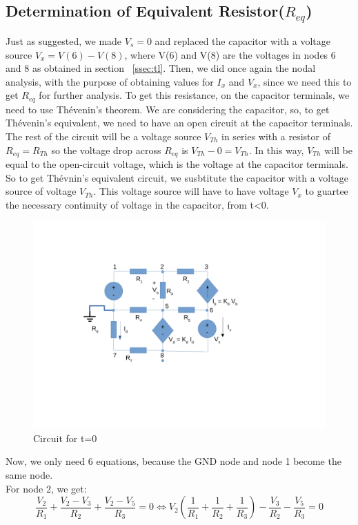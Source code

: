 \subsection{Determination of Equivalent Resistor($R_{eq}$)}
\label{ssec:R}
Just as suggested, we made $V_s = 0$ and replaced the capacitor with a voltage source $V_x= V(6)-V(8)$, where V(6) and V(8) are the voltages in nodes 6 and 8 as obtained in section ~\ref{ssec:tl}. Then, we did once again the nodal analysis, with the purpose of obtaining values for $I_x$ and $V_x$, since we need this to get $R_{eq}$ for further analysis. To get this resistance, on the capacitor terminals, we need to use Thévenin's theorem. We are considering the capacitor, so, to get Thévenin's equivalent, we need to have an open circuit at the capacitor terminals. The rest of the circuit will be a voltage source $V_{Th}$ in series with a resistor of $R_{eq}=R_{Th}$ so the voltage drop across $R_{eq}$ is  $V_{Th}-0= V_{Th}$. In this way,  $V_{Th}$ will be equal to the open-circuit voltage, which is the voltage at the capacitor terminals. So to get Thévnin's equivalent circuit, we susbtitute the capacitor with a voltage source of voltage $V_{Th}$. This voltage source will have to have voltage $V_x$ to guartee the necessary continuity of voltage in the capacitor, from t\textless0.\\
\begin{figure}[H] \centering
\includegraphics[width=0.8\linewidth]{vx.pdf}
\caption{Circuit for t=0}
\label{fig:zim}
\end{figure}
Now, we only need 6 equations, because the GND node and node 1 become the same node.\\
For node 2, we get:
\begin{equation}
\frac{V_2}{R_1} + \frac{V_2 - V_3}{R_2} + \frac{V_2 - V_5}{R_3} = 0 \Leftrightarrow V_2\left( \frac{1}{R_1} + \frac{1}{R_2} + \frac{1}{R_3} \right) - \frac{V_3}{R_2} - \frac{V_5}{R_3}=0
\end{equation}


